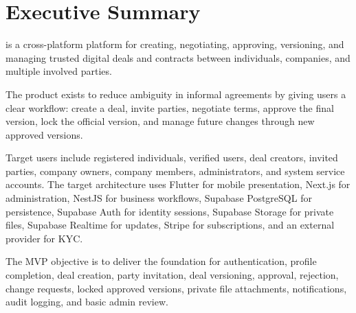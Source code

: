 \chapter{Executive Summary}
\projectname{} is a cross-platform platform for creating, negotiating, approving, versioning, and managing trusted digital deals and contracts between individuals, companies, and multiple involved parties.

The product exists to reduce ambiguity in informal agreements by giving users a clear workflow: create a deal, invite parties, negotiate terms, approve the final version, lock the official version, and manage future changes through new approved versions.

Target users include registered individuals, verified users, deal creators, invited parties, company owners, company members, administrators, and system service accounts. The target architecture uses Flutter for mobile presentation, Next.js for administration, NestJS for business workflows, Supabase PostgreSQL for persistence, Supabase Auth for identity sessions, Supabase Storage for private files, Supabase Realtime for updates, Stripe for subscriptions, and an external provider for KYC.


The MVP objective is to deliver the foundation for authentication, profile completion, deal creation, party invitation, deal versioning, approval, rejection, change requests, locked approved versions, private file attachments, notifications, audit logging, and basic admin review.
